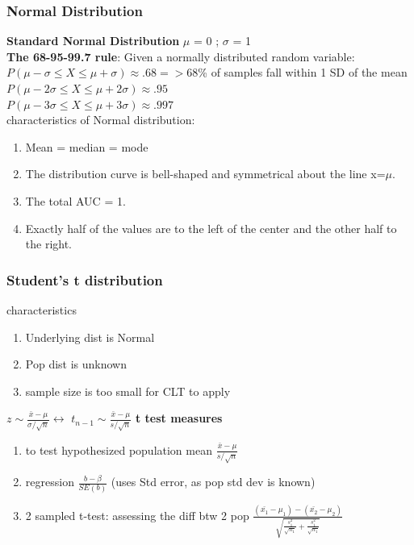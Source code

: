 \documentclass{beamer}
\begin{document}
\begin{frame}\frametitle{Normal Distribution}
\textbf{Standard Normal Distribution} $\mu$ = 0 ; $\sigma$ = 1 \\
\textbf{The 68-95-99.7 rule}: Given a normally distributed random variable:
$P(\mu-\sigma \leq X \leq \mu+\sigma) \approx .68 =>$68\% of samples fall within 1 SD of the mean \\
$P(\mu-2\sigma \leq X \leq \mu+2\sigma) \approx .95$ \\
$P(\mu-3\sigma \leq X \leq \mu+3\sigma) \approx .997$ \\

characteristics of Normal distribution:
	\begin{enumerate}
		\item Mean = median = mode
		\item The distribution curve is bell-shaped and symmetrical about the line x=$\mu$.
		\item The total AUC = 1.
		\item Exactly half of the values are to the left of the center and the other half to the right.
	\end{enumerate}
	
\end{frame}

\begin{frame}\frametitle{Student's t distribution}
	characteristics\\
	\begin{enumerate}
		\item Underlying dist is Normal
		\item Pop dist is unknown
		\item sample size is too small for CLT to apply
	\end{enumerate}
	$z \sim \frac{\bar{x}-\mu}{\sigma/\sqrt{n}} \longleftrightarrow$
	$t_{n-1} \sim \frac{\bar{x}-\mu}{s/\sqrt{n}} $	
	\textbf{t test measures}
	\begin{enumerate}
		\item to test hypothesized population mean $\frac{\bar{x}-\mu}{s/\sqrt{n}}$
		\item regression $\frac{b-\beta}{SE(b)}$ (uses Std error, as pop std dev is known)
		\item 2 sampled t-test: assessing the diff btw 2 pop 
		$\frac{(\bar{x_1}-\mu_1)-(\bar{x_2}-\mu_2)}
		{\sqrt{\frac{s_1^2}{\sqrt{n_1}}+\frac{s_1^2}{\sqrt{n_1}}}}$
	\end{enumerate}
\end{frame}
\end{document}
